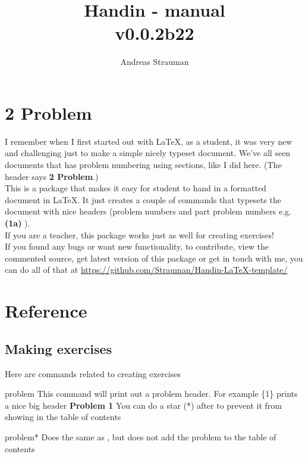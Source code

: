 \documentclass{article}
\title{Handin - manual\\{\normalsize v0.0.2b22}}
\author{Andreas Strauman}
\let\dac\docAuxCommand
\begin{document}
\maketitle
\section*{2 Problem}
I remember when I first started out with LaTeX, as a student, it was very new and challenging just to make a simple nicely typeset document. We've all seen documents that has problem numbering using sections, like I did here. (The header says \textbf{2 Problem}.)\\

This is a package that makes it easy for student to hand in a formatted document in LaTeX. It just creates a couple of commands that typesets the document with nice headers (problem numbers and part problem numbers e.g. \textbf{(1a)} ).\\

If you are a teacher, this package works just as well for creating exercises!\\
 
If you found any bugs or want new functionality, to contribute, view the commented source, get latest version of this package or get in touch with me, you can do all of that at \url{https://github.com/Strauman/Handin-LaTeX-template/}
\tableofcontents
\clearpage
 \section{Reference}
\subsection{Making exercises}
 Here are commands related to creating exercises


\begin{docCommand}[]{problem}{}
 This command will print out a problem header. For example \dac{problem}\{1\}
 prints a nice big header \textbf{Problem 1} You can do a star (*) after \dac{problem} to
 prevent it from showing in the table of contents

\end{docCommand}

\begin{docCommand}[]{problem*}{}
 Does the same as \dac{problem}, but does not add the problem to the table of contents

\end{docCommand}
\end{document}

